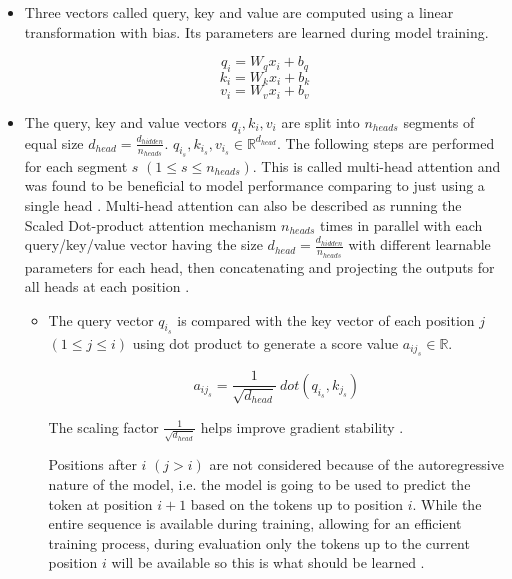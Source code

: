 \begin{itemize}



\item Three vectors called query, key and value are computed using a linear transformation with bias. Its parameters are learned during model training.
 
 $$q_i = W_q x_i + b_q$$
 $$k_i = W_k x_i + b_k$$
 $$v_i = W_v x_i + b_v$$

\item The query, key and value vectors $q_i, k_i, v_i$ are split into $n_{heads}$ segments of equal size $d_{head} = \frac{d_{hidden}}{n_{heads}}$. $q_{i_s}, k_{i_s}, v_{i_s} \in \mathbb{R}^{d_{head}}$. The following steps are performed for each segment $s$ $(1 \leq s \leq n_{heads})$. This is called multi-head attention and was found to be beneficial to model performance comparing to just using a single head  \cite{alammar-gpt2}.
Multi-head attention can also be described as running the Scaled Dot-product attention mechanism $n_{heads}$ times in parallel with each query/key/value vector having the size $d_{head} = \frac{d_{hidden}}{n_{heads}}$ with different learnable parameters for each head, then concatenating and projecting the outputs for all heads at each position .



\begin{samepage}
\begin{itemize}

\item The query vector $q_{i_s}$ is compared with the key vector of each position $j$  $(1 \leq j \leq i)$ using dot product to generate a score value $a_{ij_s}\in \mathbb{R}$.

$$a_{ij_s} = \frac {1} {\sqrt{d_{head}}} \ dot(q_{i_s}, k_{j_s})$$

The scaling factor $\frac {1} {\sqrt{d_{head}}}$ helps improve gradient stability .

Positions after $i$ $(j > i)$ are not considered because of the autoregressive nature of the model, i.e. the model is going to be used to predict the token at position $i+1$ based on the tokens up to position $i$. While the entire sequence is available during training, allowing for an efficient training process, during evaluation only the tokens up to the current position $i$ will be available so this is what should be learned .



\end{itemize}
\end{samepage}
\end{itemize}
